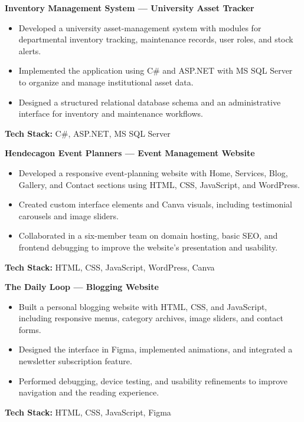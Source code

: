 \noindent\textbf{Inventory Management System --- University Asset Tracker}
\begin{itemize}[leftmargin=*,nosep,topsep=3pt]
  \item Developed a university asset-management system with modules for departmental inventory tracking, maintenance records, user roles, and stock alerts.
  \item Implemented the application using C\# and ASP.NET with MS SQL Server to organize and manage institutional asset data.
  \item Designed a structured relational database schema and an administrative interface for inventory and maintenance workflows.
\end{itemize}
\noindent\textbf{Tech Stack:} C\#, ASP.NET, MS SQL Server\par\medskip

\noindent\textbf{Hendecagon Event Planners --- Event Management Website}
\begin{itemize}[leftmargin=*,nosep,topsep=3pt]
  \item Developed a responsive event-planning website with Home, Services, Blog, Gallery, and Contact sections using HTML, CSS, JavaScript, and WordPress.
  \item Created custom interface elements and Canva visuals, including testimonial carousels and image sliders.
  \item Collaborated in a six-member team on domain hosting, basic SEO, and frontend debugging to improve the website's presentation and usability.
\end{itemize}
\noindent\textbf{Tech Stack:} HTML, CSS, JavaScript, WordPress, Canva\par\medskip

\noindent\textbf{The Daily Loop --- Blogging Website}
\begin{itemize}[leftmargin=*,nosep,topsep=3pt]
  \item Built a personal blogging website with HTML, CSS, and JavaScript, including responsive menus, category archives, image sliders, and contact forms.
  \item Designed the interface in Figma, implemented animations, and integrated a newsletter subscription feature.
  \item Performed debugging, device testing, and usability refinements to improve navigation and the reading experience.
\end{itemize}
\noindent\textbf{Tech Stack:} HTML, CSS, JavaScript, Figma\par\medskip

